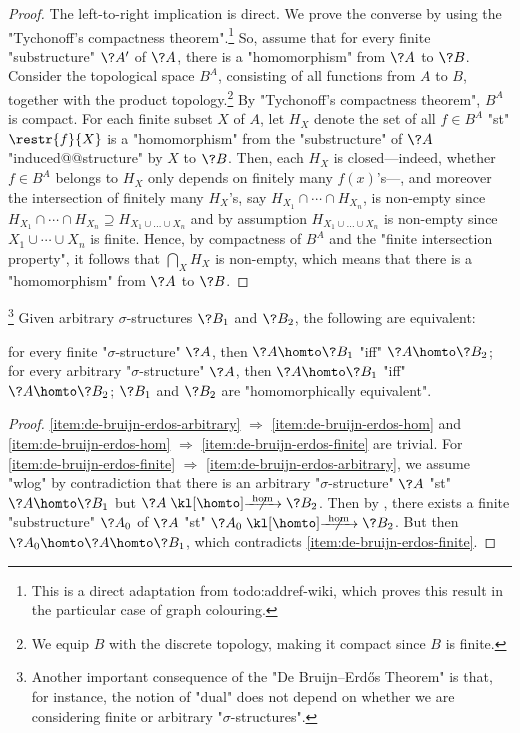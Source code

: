 \begin{proof}
	The left-to-right implication is direct.
	We prove the converse by using the "Tychonoff's compactness theorem".\footnote{This is a direct adaptation from todo:addref-wiki, which proves this result in the particular case of graph colouring.}
	So, assume that for every finite "substructure" $\?A'$ of $\?A$,
	there is a "homomorphism" from $\?A$ to $\?B$. 
	Consider the topological space $B^A$, consisting of all functions from $A$ to $B$,
	together with the product topology.\footnote{We equip $B$ with the discrete topology,
	making it compact since $B$ is finite.} By "Tychonoff's compactness theorem",
	$B^A$ is compact. For each finite subset $X$ of $A$, let
	$H_X$ denote the set of all $f \in B^A$ "st" $\restr{f}{X}$ is a "homomorphism"
	from the "substructure" of $\?A$ "induced@@structure" by $X$ to $\?B$.
	Then, each $H_X$ is closed---indeed, whether $f\in B^A$ belongs to $H_X$ only depends
	on finitely many $f(x)$'s---, and moreover the intersection of finitely many
	$H_X$'s, say $H_{X_1} \cap \cdots \cap H_{X_n}$, is non-empty since
	$H_{X_1} \cap \cdots \cap H_{X_n} \supseteq H_{X_1\cup \hdots \cup X_n}$
	and by assumption $H_{X_1\cup \hdots \cup X_n}$ is non-empty since $X_1 \cup \cdots \cup X_n$ is finite. Hence, by compactness of $B^A$ and the "finite intersection property", it follows
	that $\bigcap_X H_X$ is non-empty, which means that there is a "homomorphism" from $\?A$ to $\?B$.
\end{proof}

\begin{corollary}
	\!\footnote{Another important consequence of the "De Bruijn–Erdős Theorem" is that,
	for instance, the notion of "dual" does not depend on whether we are considering finite or
	arbitrary "$\sigma$-structures".}
	\AP\label{coro:de-bruijn-erdos}
	Given arbitrary $\sigma$-structures $\?B_1$ and $\?B_2$, the following are equivalent:
	\begin{enumerate}
		\itemAP\label{item:de-bruijn-erdos-finite} for every finite "$\sigma$-structure" $\?A$, then $\?A \homto \?B_1$
		"iff" $\?A \homto \?B_2$;
		\itemAP\label{item:de-bruijn-erdos-arbitrary} for every arbitrary "$\sigma$-structure" $\?A$, then $\?A \homto \?B_1$
			"iff" $\?A \homto \?B_2$;
		\itemAP\label{item:de-bruijn-erdos-hom} $\?B_1$ and $\?B_2$ are "homomorphically equivalent".
	\end{enumerate}
\end{corollary}
\begin{proof}
	\eqref{item:de-bruijn-erdos-arbitrary} $\Rightarrow$ \eqref{item:de-bruijn-erdos-hom}
	and \eqref{item:de-bruijn-erdos-hom} $\Rightarrow$ \eqref{item:de-bruijn-erdos-finite}
	are trivial.
	For \eqref{item:de-bruijn-erdos-finite} $\Rightarrow$ \eqref{item:de-bruijn-erdos-arbitrary},
	we assume "wlog" by contradiction that there is an arbitrary "$\sigma$-structure" $\?A$ "st" $\?A \homto \?B_1$ but $\?A \nothomto \?B_2$. Then by ,
	there exists a finite "substructure" $\?A_0$ of $\?A$ "st" $\?A_0 \nothomto \?B_2$.
	But then $\?A_0 \homto \?A \homto \?B_1$, which contradicts \eqref{item:de-bruijn-erdos-finite}.
\end{proof}


